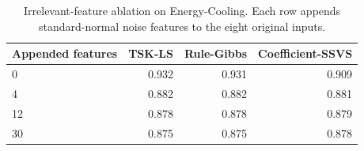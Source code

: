 \begin{table}[htbp]
\centering
\caption{Irrelevant-feature ablation on Energy-Cooling. Each row appends standard-normal noise features to the eight original inputs.}
\label{tab:noise}
\scriptsize
\begin{tabular}{lrrr}
\toprule
Appended features & TSK-LS & Rule-Gibbs & Coefficient-SSVS \\
\midrule
0 & 0.932 & 0.931 & 0.909 \\
4 & 0.882 & 0.882 & 0.881 \\
12 & 0.878 & 0.878 & 0.879 \\
30 & 0.875 & 0.875 & 0.878 \\
\bottomrule
\end{tabular}
\end{table}
